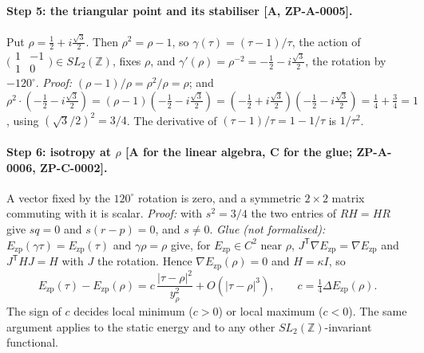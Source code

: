 \documentclass[10pt]{article}
\newcommand{\tier}[1]{\textsf{[#1]}}
\newcommand{\Ezp}{E_{\mathrm{zp}}}
\begin{document}
\paragraph{Step 5: the triangular point and its stabiliser \tier{A, ZP-A-0005}.} Put $\rho=\tfrac12+i\tfrac{\sqrt3}2$. Then $\rho^2=\rho-1$,
so $\gamma(\tau)=(\tau-1)/\tau$, the action of $\bigl(\begin{smallmatrix}1&-1\\1&0\end{smallmatrix}\bigr)\in SL_2(\mathbb Z)$, fixes $\rho$, and
$\gamma'(\rho)=\rho^{-2}=-\tfrac12-i\tfrac{\sqrt3}2$, the rotation by $-120^\circ$. \emph{Proof:} $(\rho-1)/\rho=\rho^2/\rho=\rho$; and $\rho^2\cdot(-\tfrac12-i\tfrac{\sqrt3}2)=(\rho-1)(-\tfrac12-i\tfrac{\sqrt3}2)=(-\tfrac12+i\tfrac{\sqrt3}2)(-\tfrac12-i\tfrac{\sqrt3}2)=\tfrac14+\tfrac34=1$,
using $(\sqrt3/2)^2=3/4$. The derivative of $(\tau-1)/\tau=1-1/\tau$ is $1/\tau^2$.


\paragraph{Step 6: isotropy at $\rho$ \tier{A for the linear algebra, C for the glue; ZP-A-0006, ZP-C-0002}.} A vector fixed by the $120^\circ$ rotation is zero, and a
symmetric $2\times2$ matrix commuting with it is scalar. \emph{Proof:} with $s^2=3/4$ the two entries of $RH=HR$ give $sq=0$ and $s(r-p)=0$, and $s\ne0$.
\emph{Glue (not formalised):} $\Ezp(\gamma\tau)=\Ezp(\tau)$ and $\gamma\rho=\rho$ give, for $\Ezp\in C^2$ near $\rho$, $J^{\mathsf T}\nabla\Ezp=\nabla\Ezp$ and $J^{\mathsf T}HJ=H$ with $J$ the rotation.
Hence $\nabla\Ezp(\rho)=0$ and $H=\kappa I$, so
\[\Ezp(\tau)-\Ezp(\rho)=c\,\frac{|\tau-\rho|^2}{y_\rho^2}+O(|\tau-\rho|^3),\qquad c=\tfrac14\Delta\Ezp(\rho).\]
The sign of $c$ decides local minimum ($c>0$) or local maximum ($c<0$). The same argument applies to the static energy and to any other $SL_2(\mathbb Z)$-invariant functional.

\end{document}
